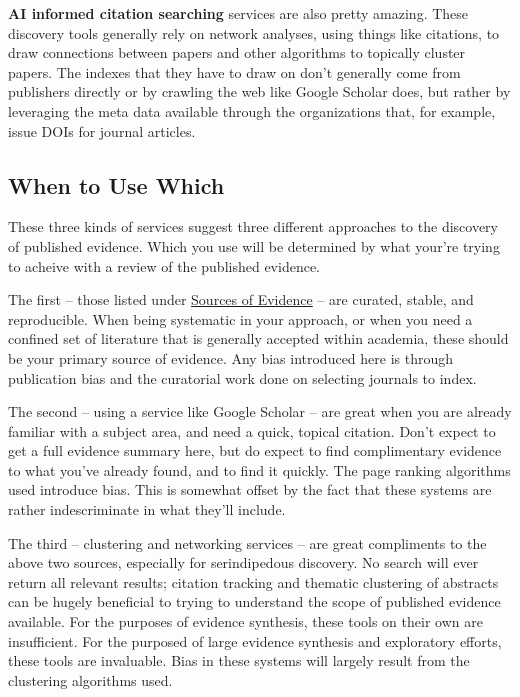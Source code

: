 \documentclass[
]{book}
\begin{document}
\textbf{AI informed citation searching} services are also pretty amazing. These discovery tools generally rely on network analyses, using things like citations, to draw connections between papers and other algorithms to topically cluster papers. The indexes that they have to draw on don't generally come from publishers directly or by crawling the web like Google Scholar does, but rather by leveraging the meta data available through the organizations that, for example, issue DOIs for journal articles.

\hypertarget{when-to-use-which}{%
\subsection{When to Use Which}\label{when-to-use-which}}

These three kinds of services suggest three different approaches to the discovery of published evidence. Which you use will be determined by what your're trying to acheive with a review of the published evidence.

The first -- those listed under \href{}{Sources of Evidence} -- are curated, stable, and reproducible. When being systematic in your approach, or when you need a confined set of literature that is generally accepted within academia, these should be your primary source of evidence. Any bias introduced here is through publication bias and the curatorial work done on selecting journals to index.

The second -- using a service like Google Scholar -- are great when you are already familiar with a subject area, and need a quick, topical citation. Don't expect to get a full evidence summary here, but do expect to find complimentary evidence to what you've already found, and to find it quickly. The page ranking algorithms used introduce bias. This is somewhat offset by the fact that these systems are rather indescriminate in what they'll include.

The third -- clustering and networking services -- are great compliments to the above two sources, especially for serindipedous discovery. No search will ever return all relevant results; citation tracking and thematic clustering of abstracts can be hugely beneficial to trying to understand the scope of published evidence available. For the purposes of evidence synthesis, these tools on their own are insufficient. For the purposed of large evidence synthesis and exploratory efforts, these tools are invaluable. Bias in these systems will largely result from the clustering algorithms used.
\end{document}
